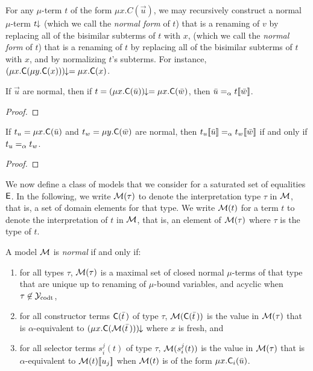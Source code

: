 For any $\mu$-term $t$ of the form $\mu x. C( \vec u )$, we may recursively construct a normal $\mu$-term ${t}\!\!\downarrow$
(which we call the \emph{normal form} of $t$)
that is a renaming of $v$ by replacing all of the bisimilar subterms of $t$ with $x$,
(which we call the \emph{normal form} of $t$)
that is a renaming of $t$ by replacing all of the bisimilar subterms of $t$ with $x$,
and by normalizing $t$'s subterms.
For instance, ${(\mu x. \textsf{C}( \mu y. \textsf{C}( x ) ))}\!\!\downarrow = \mu x. \textsf{C}( x )$.

\begin{lemma}
\label{lem:mu-norm-arg}
If $\vec u$ are normal, then if $t = {(\mu x. \textsf{C}( \bar u ) )}\!\!\downarrow = \mu x. \textsf{C}( \bar w )$,
then $\bar u \mathrel{=_\alpha} t[\![ \bar w ]\!]$.
\end{lemma}
\begin{proof}
\end{proof}

\begin{lemma}
\label{lem:mu-cong}
If $t_u = \mu x. \textsf{C}( \bar u )$ and $t_w = \mu y. \textsf{C}( \bar w )$ are normal,
then $t_u[\![  \bar u  ]\!] \mathrel{=_\alpha} t_w[\![  \bar w  ]\!]$ if and only if $t_u \mathrel{=_\alpha} t_w$.
\end{lemma}
\begin{proof}
\end{proof}

We now define a class of models that we consider for a saturated set of equalities $\mathsf{E}$.
In the following, we write $\mathcal{M}( \tau )$ to denote the interpretation type $\tau$ in $\mathcal{M}$,
that is, a set of domain elements for that type.
We write $\mathcal{M}( t )$ for a term $t$ to denote the interpretation of $t$ in $\mathcal{M}$,
that is, an element of $\mathcal{M}( \tau )$ where $\tau$ is the type of $t$.

\begin{definition} \label{def:norm-model}
A model $\mathcal{M}$ is \emph{normal} if and only if:
\begin{enumerate}
\item 
for all types $\tau$, 
$\mathcal{M}( \tau )$ is a maximal set of closed normal $\mu$-terms of that type that are 
unique up to renaming of $\mu$-bound variables,
and acyclic when $\tau \not\in \mathcal{Y}_{\mathrm{codt}}$,
\item 
for all constructor terms $\textsf{C}( \bar t \,)$ of type $\tau$,
$\mathcal{M}( \textsf{C}( \bar t \,) )$ is the value 
in $\mathcal{M}( \tau )$ that is $\alpha$-equivalent to
${(\mu x. \textsf{C}( \mathcal{M}( \bar t \,) ))}\!\!\downarrow$ where $x$ is fresh, and
\item 
for all selector terms $s^j_i( t )$ of type $\tau$,%
$\mathcal{M}( s^j_i( t ) )$ is the value
in $\mathcal{M}( \tau )$ that is $\alpha$-equivalent to
$\mathcal{M}( t )[\![ u_j ]\!]$
when $\mathcal{M}( t )$ is of the form $\mu x. \textsf{C}_i( \bar u )$.
\end{enumerate}
\end{definition}

